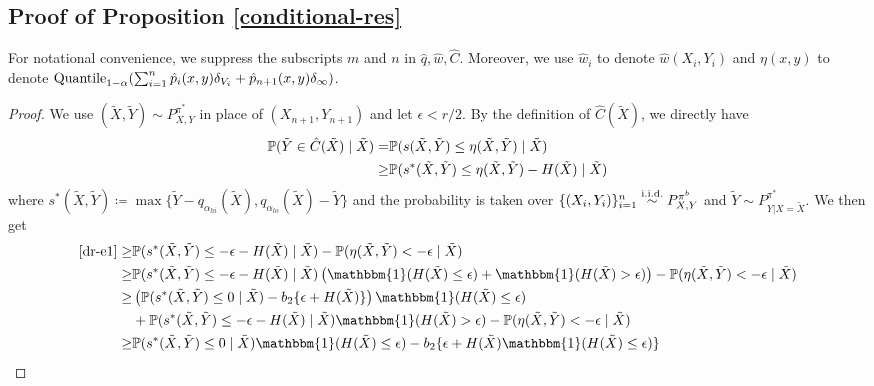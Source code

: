 \subsection{Proof of Proposition \ref{conditional-res}}
For notational convenience, we suppress the subscripts $m$ and $n$ in $\hat{q}, \hat{w}, \hat{C}$. Moreover, we use $\hat{w}_i$ to denote $\hat{w}(X_i, Y_i)$ and $\eta(x, y)$ to denote $\textup{Quantile}_{1-\alpha}(\sum_{i=1}^n \hat{p}_i(x, y)\delta_{V_i} + \hat{p}_{n+1}(x, y) \delta_{\infty})$.

%
%
%
%
%
%
%
\begin{proof}


We use $(\tilde{X}, \tilde{Y}) \sim P^{\pi^*}_{X,Y}$ in place of $(X_{n+1}, Y_{n+1})$ and let $\epsilon < r/2$. By the definition of $\hat{C}(\tilde{X})$, we directly have
\begin{align}
    \mathbb{P}(\tilde{Y} \in \hat{C}(\tilde{X}) \mid \tilde{X}) =& \mathbb{P}(s(\tilde{X}, \tilde{Y}) \leq \eta(\tilde{X}, \tilde{Y}) \mid \tilde{X}) \nonumber \\
    \geq& \mathbb{P}(s^*(\tilde{X}, \tilde{Y}) \leq \eta(\tilde{X}, \tilde{Y}) - H(\tilde{X}) \mid \tilde{X}) \label{dr-e1}
\end{align}
where $ s^*(\tilde{X}, \tilde{Y}) \coloneqq \max \{\tilde{Y} - q_{\alpha_{hi}}(\tilde{X}), q_{\alpha_{lo}}(\tilde{X}) - \tilde{Y} \}$ and the probability is taken over $\{(X_i, Y_i)\}_{i=1}^n\overset{\textup{i.i.d.}}{\sim} P^{\pi^b}_{X, Y}$ and $\tilde{Y} \sim P^{\pi^*}_{Y|X=\tilde{X}}$. We then get 
\begin{align}
    \eqref{dr-e1} \geq& \p(s^*(\tilde{X}, \tilde{Y}) \leq -\epsilon - H(\tilde{X}) \mid \tilde{X}) - \p(\eta(\tilde{X}, \tilde{Y}) < -\epsilon \mid \tilde{X}) \nonumber \\
    \geq& \p(s^*(\tilde{X}, \tilde{Y}) \leq -\epsilon - H(\tilde{X}) \mid \tilde{X}) \left(\mathbbm{1}(H(\tilde{X}) \leq \epsilon) + \mathbbm{1}(H(\tilde{X}) > \epsilon)\right) - \p(\eta(\tilde{X}, \tilde{Y}) < -\epsilon \mid \tilde{X}) \label{dr-eq2} \\
    \geq& \left(\p(s^*(\tilde{X}, \tilde{Y}) \leq 0 \mid \tilde{X}) - b_2 \{ \epsilon + H(\tilde{X})\}\right)\mathbbm{1}(H(\tilde{X}) \leq \epsilon)\nonumber \\ 
    & + \p(s^*(\tilde{X}, \tilde{Y}) \leq -\epsilon - H(\tilde{X}) \mid \tilde{X})\mathbbm{1}(H(\tilde{X}) > \epsilon) - \p(\eta(\tilde{X}, \tilde{Y}) < -\epsilon \mid \tilde{X})   \label{dr-eq3} \\
    \geq& \p(s^*(\tilde{X}, \tilde{Y}) \leq 0 \mid \tilde{X})\mathbbm{1}(H(\tilde{X}) \leq \epsilon) - b_2 \{ \epsilon + H(\tilde{X})\mathbbm{1}(H(\tilde{X}) \leq \epsilon)\} \nonumber \\ 

\end{align}
\end{proof}
